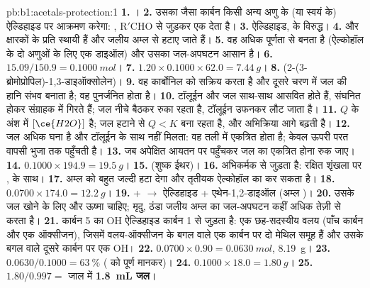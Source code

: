\begin{solution}{pb:b1:acetals-protection:1}
\textbf{1.} ।
\textbf{2.} उसका  जैसा कार्बन किसी अन्य अणु के (या स्वयं के) ऐल्डिहाइड पर
आक्रमण करेगा: , $\mathrm{R'CHO}$ से जुड़कर एक  देता है।
\textbf{3.} ऐल्डिहाइड,  के विरुद्ध।
\textbf{4.}   और क्षारकों के प्रति स्थायी हैं और
जलीय अम्ल से हटाए जाते हैं।
\textbf{5.} वह अधिक पूर्णता से बनता है (ऐल्कोहॉल के दो अणुओं के लिए एक डाइऑल)
और उसका जल-अपघटन आसान है।
\textbf{6.} $15.09/150.9 = \qty{0.1000}{mol}$।
\textbf{7.} $1.20 \times 0.1000 \times 62.0 = \qty{7.44}{g}$।
\textbf{8.} 
(2-(3-ब्रोमोप्रोपिल)-1,3-डाइऑक्सोलेन)।
\textbf{9.} वह कार्बोनिल को सक्रिय करता है और दूसरे चरण में जल की हानि
संभव बनाता है; वह पुनर्जनित होता है।
\textbf{10.} टॉलूईन और जल साथ-साथ आसवित होते हैं, संघनित होकर
संग्राहक में गिरते हैं; जल नीचे बैठकर रुका रहता है, टॉलूईन उफनकर लौट जाता है।
\textbf{11.} $Q$ के अंश में $[\ce{H2O}]$ है; जल हटाने से
$Q < K$ बना रहता है, और अभिक्रिया आगे बढ़ती है।
\textbf{12.} जल अधिक घना है और टॉलूईन के साथ नहीं मिलता: वह तली में
एकत्रित होता है; केवल ऊपरी परत वापसी भुजा तक पहुँचती है।
\textbf{13.} जब अपेक्षित आयतन पर पहुँचकर जल का एकत्रित होना रुक जाए।
\textbf{14.} $0.1000 \times 194.9 = \qty{19.5}{g}$।
\textbf{15.}  (शुष्क ईथर)।
\textbf{16.} अभिकर्मक  से जुड़ता है: रक्षित शृंखला पर
 ,  के साथ।
\textbf{17.} अम्ल  को बहुत जल्दी हटा देगा और
तृतीयक ऐल्कोहॉल का  कर सकता है।
\textbf{18.} $0.0700 \times 174.0 = \qty{12.2}{g}$।
\textbf{19.}  +  $\to$ ऐल्डिहाइड + एथेन-1,2-डाइऑल
(अम्ल )।
\textbf{20.} उसके जल खोने के लिए  और ऊष्मा चाहिए; मृदु, ठंडा
जलीय अम्ल  का जल-अपघटन कहीं अधिक तेज़ी से करता है।
\textbf{21.} कार्बन 5 का OH ऐल्डिहाइड कार्बन 1 से जुड़ता है: एक छह-सदस्यीय
वलय (पाँच कार्बन और एक ऑक्सीजन), जिसमें वलय-ऑक्सीजन के बगल वाले एक कार्बन पर दो मेथिल
समूह हैं और उसके बगल वाले दूसरे कार्बन पर एक OH।
\textbf{22.} $0.0700 \times 0.90 = \qty{0.0630}{mol}$, \qty{8.19}{g}।
\textbf{23.} $0.0630/0.1000 = \qty{63}{\percent}$ ( को
पूर्ण मानकर)।
\textbf{24.} $0.1000 \times 18.0 = \qty{1.80}{g}$।
\textbf{25.} $1.80/0.997 =$ जाल में \textbf{\qty{1.8}{mL} जल}।
\end{solution}

